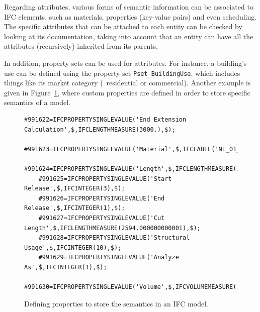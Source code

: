 Regarding attributes, various forms of semantic information can be associated to IFC elements, such as materials, properties (key-value pairs) and even scheduling.
The specific attributes that can be attached to each entity can be checked by looking at its documentation, taking into account that an entity can have all the attributes (recursively) inherited from its parents.

In addition, property sets can be used for attributes.
For instance, a building's use can be defined using the property set \texttt{Pset\_BuildingUse}, which includes things like its market category (\eg\ residential or commercial).
Another example is given in Figure~\ref{fig:pset}, where custom properties are defined in order to store specific semantics of a model.

\begin{figure}
	\begin{lstlisting}[frame=single]
	#991622=IFCPROPERTYSINGLEVALUE('End Extension Calculation',$,IFCLENGTHMEASURE(3000.),$);
	#991623=IFCPROPERTYSINGLEVALUE('Material',$,IFCLABEL('NL_01_hout_plaat'),$);
	#991624=IFCPROPERTYSINGLEVALUE('Length',$,IFCLENGTHMEASURE(2594.),$);
	#991625=IFCPROPERTYSINGLEVALUE('Start Release',$,IFCINTEGER(3),$);
	#991626=IFCPROPERTYSINGLEVALUE('End Release',$,IFCINTEGER(1),$);
	#991627=IFCPROPERTYSINGLEVALUE('Cut Length',$,IFCLENGTHMEASURE(2594.000000000001),$);
	#991628=IFCPROPERTYSINGLEVALUE('Structural Usage',$,IFCINTEGER(10),$);
	#991629=IFCPROPERTYSINGLEVALUE('Analyze As',$,IFCINTEGER(1),$);
	#991630=IFCPROPERTYSINGLEVALUE('Volume',$,IFCVOLUMEMEASURE(13602936.00000029),$);
\end{lstlisting}
	\caption{Defining properties to store the semantics in an IFC model.}%
	\label{fig:pset}
\end{figure}




